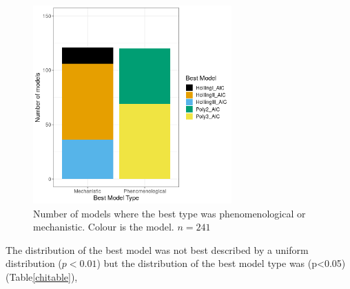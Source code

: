 \documentclass{article}
\begin{document}
\begin{figure}[h!] %
    \centering
    \includegraphics[width=3in]{../Results/Plots/modelbesttype.png}
    \caption{Number of models where the best type was phenomenological or mechanistic. Colour is the model. $n=241$}
    \label{fig:modelbesttype}
\end{figure}
The distribution of the best model was not best described by a uniform distribution ($p<0.01$) but the distribution of the best model type was (p<0.05) (Table\ref{chitable}),

\end{document}
